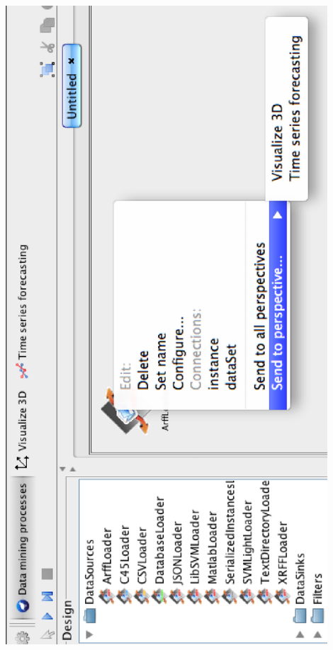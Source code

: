 \begin{center}
  \includegraphics[angle=270,width=12cm]{images/knowledgeflow/sendToPerspective.eps}
\end{center}

